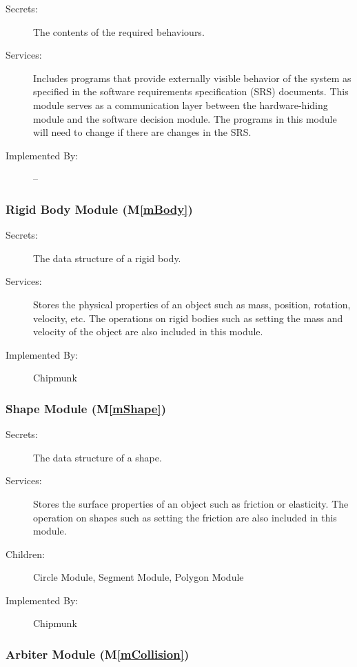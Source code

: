 \documentclass[12pt]{article}
\newcommand{\mref}[1]{M\ref{#1}}
\begin{document}
\begin{description}
\item[Secrets:]The contents of the required behaviours.
\item[Services:]Includes programs that provide externally visible behavior of
  the system as specified in the software requirements specification (SRS)
  documents. This module serves as a communication layer between the
  hardware-hiding module and the software decision module. The programs in this
  module will need to change if there are changes in the SRS.
\item[Implemented By:] --
\end{description}

\subsubsection{Rigid Body Module (\mref{mBody})}

\begin{description}
\item[Secrets:]The data structure of a rigid body.
\item[Services:]Stores the physical properties of an object such as mass, 
position, rotation, velocity, etc.  The operations on rigid bodies such 
as setting the mass and velocity of the object are also
included in this module.

\item[Implemented By:] Chipmunk
\end{description}

\subsubsection{Shape Module (\mref{mShape})}

\begin{description}
\item[Secrets:]The data structure of a shape.
\item[Services:]Stores the surface properties of an object such as friction or 
elasticity. The operation on shapes such as setting the friction
are also included in this module.
\item[Children:] Circle Module, Segment Module, Polygon Module
\item[Implemented By:] Chipmunk
\end{description}

\subsubsection{Arbiter Module (\mref{mCollision})}
\end{document}
